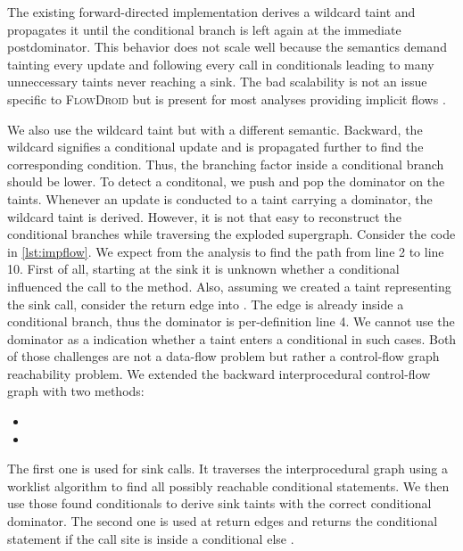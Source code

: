 \documentclass[../draft.tex]{subfiles}
\begin{document}
    The existing forward-directed implementation derives a wildcard taint\footnotemark{} and propagates it until the conditional branch is left again at the immediate postdominator.
    This behavior does not scale well because the semantics demand tainting every update and following every call in conditionals leading to many unneccessary taints never reaching a sink.
    The bad scalability is not an issue specific to \textsc{FlowDroid} but is present for most analyses providing implicit flows \cite{King2008}.

    We also use the wildcard taint but with a different semantic.
    Backward, the wildcard signifies a conditional update and is propagated further to find the corresponding condition.
    Thus, the branching factor inside a conditional branch should be lower.
    To detect a conditonal, we push and pop the dominator on the taints.
    Whenever an update is conducted to a taint carrying a dominator, the wildcard taint is derived.
    However, it is not that easy to reconstruct the conditional branches while traversing the exploded supergraph.
    Consider the code in \autoref{lst:impflow}.
    We expect from the analysis to find the path from line 2 to line 10.
    First of all, starting at the sink it is unknown whether a conditional influenced the call to the  method.
    Also, assuming we created a taint representing the sink call, consider the return edge into .
    The edge is already inside a conditional branch, thus the dominator is per-definition line 4.
    We cannot use the dominator as a indication whether a taint enters a conditional in such cases.
    Both of those challenges are not a data-flow problem but rather a control-flow graph reachability problem.
    We extended the backward interprocedural control-flow graph with two methods:
    \begin{itemize}
        \item {}
        \item {}
    \end{itemize}
    The first one is used for sink calls.
    It traverses the interprocedural graph using a worklist algorithm to find all possibly reachable conditional statements.
    We then use those found conditionals to derive sink taints with the correct conditional dominator.
    The second one is used at return edges and returns the conditional statement if the call site is inside a conditional else .
\end{document}
